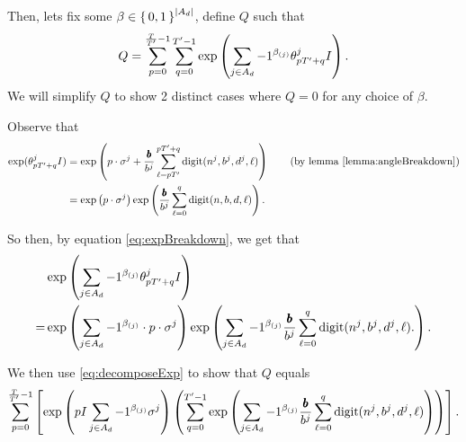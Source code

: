 \newcommand{\eqWTSInnerProd}{
  \sum_{p= 0}^{\frac{\totalPeriod}{\rationalPeriodTotal} - 1} \sum_{q = 0}^{\rationalPeriodTotal - 1}
    \exp\left(
        \sum_{j \in A_d} -1 ^ {\beta_{(j)}}
        \rationalAngle{p \rationalPeriodTotal + q}I
      \right)}

Then, lets fix some $\beta \in \set{0, 1}^{|A_d|}$, define $Q$ such that
\begin{equation}
\label{eq:wts01}  
  Q = \eqWTSInnerProd.
\end{equation}
We will simplify $Q$ to show 2 distinct cases where $Q = 0$ for any choice of $\beta$.

Observe that 
\begin{align}
  \exp(\rationalAngle{p \rationalPeriodTotal + q}I)
  &= \exp\left(p \cdot \digSumPeriodic +
    \numbToCommon \sum_{\ell = p \rationalPeriodTotal}^{p \rationalPeriodTotal + q}\mathrm{digit}(n^j, b^j, d^j, \ell)\right) \tag{by lemma \ref{lemma:angleBreakdown}} \\
    \label{eq:expBreakdown}
    &= \exp\left(p \cdot \digSumPeriodic\right) \exp\left(\numbToCommon \sum_{\ell = 0}^{q}\mathrm{digit}(n, b, d, \ell)\right).
\end{align}

So then, by equation \eqref{eq:expBreakdown}, we get that
\begin{align}
&\exp\left(
    \sum_{j \in A_d} -1 ^ {\beta_{(j)}}
    {\theta^j_{p {T}' + q}}I
\right)\notag \\ 
\label{eq:decomposeExp}
=&
\exp\left(
    \sum_{j \in A_d} -1 ^ {\beta_{(j)}}
    \cdot p \cdot
    \sigma^j
\right)
\exp\left(
    \sum_{j \in A_d} -1 ^ {\beta_{(j)}} \frac{{\pmb{b}}}{b^j}
      \sum_{\ell = 0}^{q}\mathrm{digit}(n^j, b^j, d^j, \ell).
\right).
\end{align}

We then use \eqref{eq:decomposeExp} to show that $Q$ equals
\begin{equation}
\label{eq:inner-outer-split}
  \sum_{p= 0}^{\frac{T}{{T}'} - 1} \left[
    \exp\left(
      pI \sum_{j \in A_d} -1 ^ {\beta_{(j)}}
      \sigma^j
    \right)
  \left(
  \sum_{q = 0}^{{T}' - 1}
    \exp\left(
        \sum_{j \in A_d} -1 ^ {\beta_{(j)}} \frac{{\pmb{b}}}{b^j}
          \sum_{\ell = 0}^{q}\mathrm{digit}(n^j, b^j, d^j, \ell)
    \right)\right)\right].
\end{equation}

